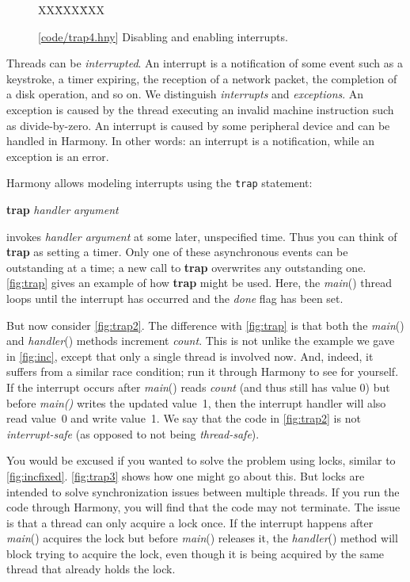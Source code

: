 \documentclass{report}
\newcommand{\harmonysource}[1]{
\begin{tabbing}
XX\=XXX\=XXX\kill
    
\end{tabbing}
}
\newcommand{\harmonylink}[1]{%
[\href{https://harmony.cs.cornell.edu/#1}{\underline{#1}}]%
}
\newenvironment{code}{
\tcolorbox
}{
\endtcolorbox
}
\begin{document}
\begin{figure}
\begin{code}
\harmonysource{trap4}
\end{code}
\caption{\harmonylink{code/trap4.hny} Disabling and enabling interrupts.}
\label{fig:trap4}
\end{figure}

Threads can be \emph{interrupted}.  An interrupt is a notification
of some event such as a keystroke, a timer expiring, the reception
of a network packet, the completion of a disk operation, and so on.
We distinguish \emph{interrupts} and \emph{exceptions}.  An exception
is caused by the thread executing an invalid machine instruction
such as divide-by-zero.  An interrupt is caused by some peripheral
device and can be handled in Harmony.  In other words: an interrupt
is a notification, while an exception is an error.  

Harmony allows modeling interrupts using the \texttt{trap} statement:
\begin{code}
\textbf{trap} \textit{handler} \textit{argument}
\end{code}
invokes \textit{handler argument} at some later, unspecified time.
Thus you can think of \textbf{trap} as setting a timer.
Only one of these asynchronous events can be outstanding at a time;
a new call to \textbf{trap} overwrites any outstanding one.
\autoref{fig:trap} gives an example of how \textbf{trap} might be used.
Here, the \textit{main}() thread loops until the interrupt has occurred and
the \textit{done} flag has been set.

But now consider \autoref{fig:trap2}.  The difference with \autoref{fig:trap} is
that both the \textit{main}() and \textit{handler}() methods increment \textit{count}.
This is not unlike the example we gave in \autoref{fig:inc}, except that only a single
thread is involved now.  And, indeed, it suffers from a similar race condition; run
it through Harmony to see for yourself.  If the interrupt occurs after \textit{main}()
reads \textit{count} (and thus still has value 0) but before \textit{main()} writes the
updated value~1, then the interrupt handler will also read value~0 and write value~1.
We say that the code in \autoref{fig:trap2} is not \textit{interrupt-safe} (as opposed
to not being \textit{thread-safe}).

You would be excused if you wanted to solve the problem using locks, similar to
\autoref{fig:incfixed}.  \autoref{fig:trap3} shows how one might go about this.
But locks are intended to solve synchronization issues between multiple threads.
If you run the code through Harmony, you will find that the code may not terminate.
The issue is that a thread can only acquire a lock once.  If the interrupt happens
after \textit{main}() acquires the lock but before \textit{main}() releases it, the
\textit{handler}() method will block trying to acquire the lock, even though
it is being acquired by the same thread that already holds the lock.
\end{document}
